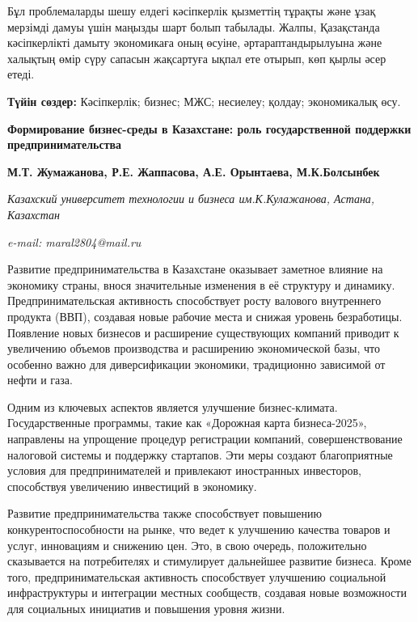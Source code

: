 Бұл проблемаларды шешу елдегі кәсіпкерлік қызметтің тұрақты және ұзақ
мерзімді дамуы үшін маңызды шарт болып табылады. Жалпы, Қазақстанда
кәсіпкерлікті дамыту экономикаға оның өсуіне, әртараптандырылуына және
халықтың өмір сүру сапасын жақсартуға ықпал ете отырып, көп қырлы әсер
етеді.

{\bfseries Түйін сөздер:} Кәсіпкерлік; бизнес; МЖС; несиелеу; қолдау;
экономикалық өсу.

\begin{articleheader}
{\bfseries Формирование бизнес-среды в Казахстане: роль государственной
поддержки предпринимательства}

{\bfseries М.Т. Жумажанова, Р.Е. Жаппасова, А.Е. Орынтаева, М.К.Болсынбек}
\end{articleheader}

\begin{affiliation}
\emph{Казахский университет технологии и бизнеса им.К.Кулажанова,
Астана, Казахстан}

\emph{e-mail: maral2804@mail.ru}
\end{affiliation}

Развитие предпринимательства в Казахстане оказывает заметное влияние на
экономику страны, внося значительные изменения в её структуру и
динамику. Предпринимательская активность способствует росту валового
внутреннего продукта (ВВП), создавая новые рабочие места и снижая
уровень безработицы. Появление новых бизнесов и расширение существующих
компаний приводит к увеличению объемов производства и расширению
экономической базы, что особенно важно для диверсификации экономики,
традиционно зависимой от нефти и газа.

Одним из ключевых аспектов является улучшение бизнес-климата.
Государственные программы, такие как «Дорожная карта бизнеса-2025»,
направлены на упрощение процедур регистрации компаний, совершенствование
налоговой системы и поддержку стартапов. Эти меры создают благоприятные
условия для предпринимателей и привлекают иностранных инвесторов,
способствуя увеличению инвестиций в экономику.

Развитие предпринимательства также способствует повышению
конкурентоспособности на рынке, что ведет к улучшению качества товаров и
услуг, инновациям и снижению цен. Это, в свою очередь, положительно
сказывается на потребителях и стимулирует дальнейшее развитие бизнеса.
Кроме того, предпринимательская активность способствует улучшению
социальной инфраструктуры и интеграции местных сообществ, создавая новые
возможности для социальных инициатив и повышения уровня жизни.

